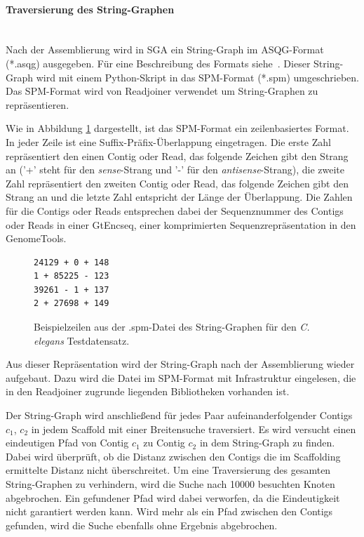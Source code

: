 \documentclass[a4paper,11pt,parskip]{scrartcl}
\begin{document}
\paragraph{Traversierung des String-Graphen}~\\
Nach der Assemblierung wird in SGA ein String-Graph im ASQG-Format
(*.asqg) ausgegeben. Für eine Beschreibung des Formats
siehe~\cite{asqg}. Dieser String-Graph wird mit einem Python-Skript in
das SPM-Format (*.spm) umgeschrieben. Das SPM-Format wird von
Readjoiner verwendet um String-Graphen zu repräsentieren.

Wie in Abbildung \ref{abb: spm} dargestellt, ist das SPM-Format ein
zeilenbasiertes Format. In jeder Zeile ist eine Suffix-Präfix-Überlappung
eingetragen. Die erste Zahl repräsentiert den einen Contig oder Read,
das folgende Zeichen gibt den Strang an ('+' steht für den
\textit{sense}-Strang und '-' für den \textit{antisense}-Strang), die
zweite Zahl repräsentiert den zweiten Contig oder Read, das folgende
Zeichen gibt den Strang an und die letzte Zahl entspricht der Länge
der Überlappung. Die Zahlen für die Contigs oder Reads entsprechen
dabei der Sequenznummer des Contigs oder Reads in einer GtEncseq,
einer komprimierten Sequenzrepräsentation in den GenomeTools.

\begin{figure}
  \centering
\begin{verbatim}
24129 + 0 + 148
1 + 85225 - 123
39261 - 1 + 137
2 + 27698 + 149
\end{verbatim}
\caption{\label{abb: spm}Beispielzeilen aus der .spm-Datei des
  String-Graphen für den \textit{C. elegans} Testdatensatz.}
\end{figure}

Aus dieser Repräsentation wird der String-Graph nach der Assemblierung
wieder aufgebaut. Dazu wird die Datei im SPM-Format mit Infrastruktur
eingelesen, die in den Readjoiner zugrunde liegenden Bibliotheken
vorhanden ist.

Der String-Graph wird anschließend für jedes Paar
aufeinanderfolgender Contigs $c_1$, $c_2$ in jedem Scaffold mit einer
Breitensuche traversiert. Es wird versucht einen eindeutigen Pfad von
Contig $c_1$ zu Contig $c_2$ in dem String-Graph zu finden. Dabei wird
überprüft, ob die Distanz zwischen den Contigs die im Scaffolding
ermittelte Distanz nicht überschreitet. Um eine Traversierung des
gesamten String-Graphen zu verhindern, wird die Suche nach \num{10000}
besuchten Knoten abgebrochen. Ein gefundener Pfad wird dabei
verworfen, da die Eindeutigkeit nicht garantiert werden kann. Wird
mehr als ein Pfad zwischen den Contigs gefunden, wird die Suche
ebenfalls ohne Ergebnis abgebrochen.
\end{document}
